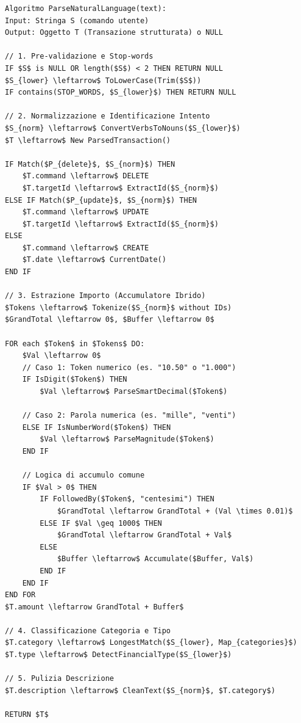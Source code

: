 \begin{lstlisting}[mathescape=true, basicstyle=\small\ttfamily]
Algoritmo ParseNaturalLanguage(text):
Input: Stringa S (comando utente)
Output: Oggetto T (Transazione strutturata) o NULL

// 1. Pre-validazione e Stop-words
IF $S$ is NULL OR length($S$) < 2 THEN RETURN NULL
$S_{lower} \leftarrow$ ToLowerCase(Trim($S$))
IF contains(STOP_WORDS, $S_{lower}$) THEN RETURN NULL

// 2. Normalizzazione e Identificazione Intento
$S_{norm} \leftarrow$ ConvertVerbsToNouns($S_{lower}$)
$T \leftarrow$ New ParsedTransaction()

IF Match($P_{delete}$, $S_{norm}$) THEN 
    $T.command \leftarrow$ DELETE
    $T.targetId \leftarrow$ ExtractId($S_{norm}$)
ELSE IF Match($P_{update}$, $S_{norm}$) THEN
    $T.command \leftarrow$ UPDATE
    $T.targetId \leftarrow$ ExtractId($S_{norm}$)
ELSE
    $T.command \leftarrow$ CREATE
    $T.date \leftarrow$ CurrentDate()
END IF

// 3. Estrazione Importo (Accumulatore Ibrido)
$Tokens \leftarrow$ Tokenize($S_{norm}$ without IDs)
$GrandTotal \leftarrow 0$, $Buffer \leftarrow 0$

FOR each $Token$ in $Tokens$ DO:
    $Val \leftarrow 0$
    // Caso 1: Token numerico (es. "10.50" o "1.000")
    IF IsDigit($Token$) THEN
        $Val \leftarrow$ ParseSmartDecimal($Token$)
    
    // Caso 2: Parola numerica (es. "mille", "venti")
    ELSE IF IsNumberWord($Token$) THEN
        $Val \leftarrow$ ParseMagnitude($Token$)
    END IF

    // Logica di accumulo comune
    IF $Val > 0$ THEN
        IF FollowedBy($Token$, "centesimi") THEN
            $GrandTotal \leftarrow GrandTotal + (Val \times 0.01)$
        ELSE IF $Val \geq 1000$ THEN
            $GrandTotal \leftarrow GrandTotal + Val$
        ELSE
            $Buffer \leftarrow$ Accumulate($Buffer, Val$)
        END IF
    END IF
END FOR
$T.amount \leftarrow GrandTotal + Buffer$

// 4. Classificazione Categoria e Tipo
$T.category \leftarrow$ LongestMatch($S_{lower}, Map_{categories}$)
$T.type \leftarrow$ DetectFinancialType($S_{lower}$)

// 5. Pulizia Descrizione
$T.description \leftarrow$ CleanText($S_{norm}$, $T.category$)

RETURN $T$

\end{lstlisting}

